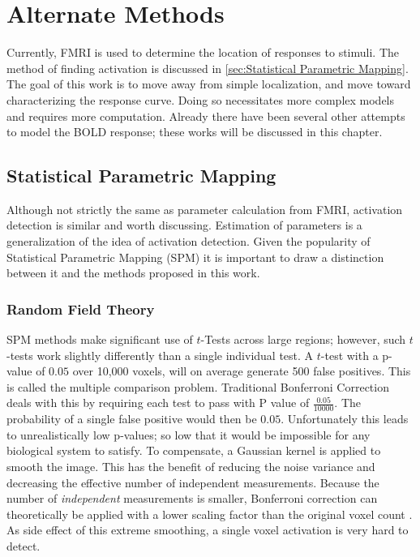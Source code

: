 \chapter{Alternate Methods}
\label{sec:Prior Works}
Currently, FMRI is used to determine the location of responses
to stimuli. The method of finding activation is discussed in 
\autoref{sec:Statistical Parametric Mapping}. The goal of this 
work is to move away from simple localization, and move toward
characterizing the response curve. Doing so 
necessitates more complex models and requires
more computation. Already there have been several other
attempts to model the BOLD response; these works will be discussed
in this chapter.

\section{Statistical Parametric Mapping}
\label{sec:Statistical Parametric Mapping}
Although not strictly the same as parameter calculation from 
FMRI, activation detection is similar and worth discussing. Estimation of 
parameters is a generalization of the idea 
of activation detection.
Given the popularity of Statistical Parametric Mapping (SPM) 
it is important to draw a distinction between it and the methods proposed
in this work.

\subsection{Random Field Theory}
\label{sec:RFT}
SPM methods make significant use of $t$-Tests across large regions;
however, such $t$-tests work slightly differently than a single
individual test. A $t$-test with a p-value of $0.05$ over 
10,000 voxels, will on average generate 500 false
positives. This is called the multiple comparison problem. Traditional
Bonferroni Correction
deals with this by requiring each test to pass with P
value of $\frac{0.05}{10000}$. The probability of 
a single false positive would then be $0.05$. Unfortunately this leads to unrealistically
low p-values; so low that it would be impossible for any biological system to satisfy. To
compensate, a Gaussian kernel is applied to smooth the image. This has
the benefit of reducing the noise variance and 
decreasing the effective number of independent measurements. Because
the number of \emph{independent} measurements is smaller, Bonferroni correction
can theoretically be applied with a lower scaling factor than
the original voxel count \cite{Worsley2004}. As side effect of this 
extreme smoothing, a single voxel activation is very hard to detect.

